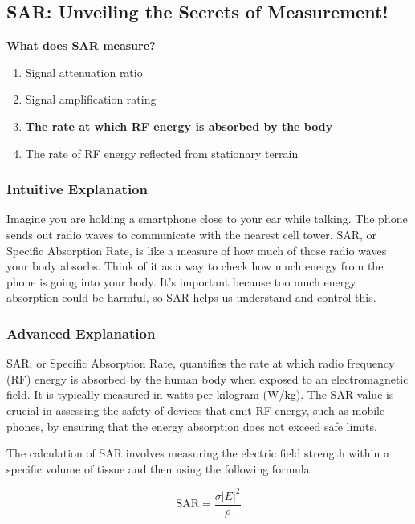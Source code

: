 \subsection{SAR: Unveiling the Secrets of Measurement!}

\begin{tcolorbox}[colback=gray!10!white,colframe=black!75!black,title=\textbf{E0A08}]
\textbf{What does SAR measure?}
\begin{enumerate}[label=\Alph*),noitemsep]
    \item Signal attenuation ratio
    \item Signal amplification rating
    \item \textbf{The rate at which RF energy is absorbed by the body}
    \item The rate of RF energy reflected from stationary terrain
\end{enumerate}
\end{tcolorbox}

\subsubsection{Intuitive Explanation}
Imagine you are holding a smartphone close to your ear while talking. The phone sends out radio waves to communicate with the nearest cell tower. SAR, or Specific Absorption Rate, is like a measure of how much of those radio waves your body absorbs. Think of it as a way to check how much energy from the phone is going into your body. It’s important because too much energy absorption could be harmful, so SAR helps us understand and control this.

\subsubsection{Advanced Explanation}
SAR, or Specific Absorption Rate, quantifies the rate at which radio frequency (RF) energy is absorbed by the human body when exposed to an electromagnetic field. It is typically measured in watts per kilogram (W/kg). The SAR value is crucial in assessing the safety of devices that emit RF energy, such as mobile phones, by ensuring that the energy absorption does not exceed safe limits.

The calculation of SAR involves measuring the electric field strength within a specific volume of tissue and then using the following formula:

\[
\text{SAR} = \frac{\sigma |E|^2}{\rho}
\]

